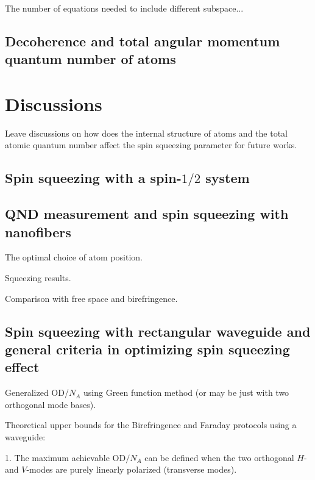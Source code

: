 \documentclass[preprint,aps,pra,onecolumn,superscriptaddress]{revtex4-1} %
\newcommand{\comment}[1]{{\color{Maroon} #1}}
\begin{document}
The number of equations needed to include different subspace...

\subsection{Decoherence and total angular momentum quantum number of atoms}

\section{Discussions} \label{Sec::Discussions}
\comment{Leave discussions on how does the internal structure of atoms and the total atomic quantum number affect the spin squeezing parameter for future works.}


\subsection{Spin squeezing with a spin-$1/2$ system} \label{Sec::squeezingwithspinhalfsystems}


\subsection{QND measurement and spin squeezing with nanofibers} \label{Sec::Nanofiber}

The optimal choice of atom position.

Squeezing results.

Comparison with free space and birefringence.


\subsection{Spin squeezing with rectangular waveguide and general criteria in optimizing spin squeezing effect} \label{Sec::Waveguide}

Generalized OD/$N_A$ using Green function method (or may be just with two orthogonal mode bases).

Theoretical upper bounds for the Birefringence and Faraday protocols using a waveguide:

1. The maximum achievable OD$ /N_A $ can be defined when the two orthogonal $ H $- and $ V $-modes are purely linearly polarized (transverse modes).
\end{document}
